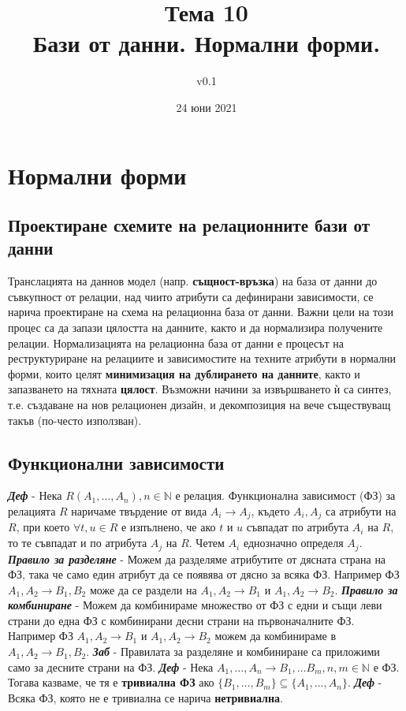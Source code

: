 \documentclass[fleqn,12pt]{article}
\title{Тема 10\\ Бази от данни. Нормални форми.}
\author{v0.1}
\date{24 юни 2021}
\begin{document}
\maketitle
\tableofcontents
\pagebreak


\section{Нормални форми}
\subsection{Проектиране схемите на релационните бази от данни}

Транслацията на даннов модел (напр. \textbf{същност-връзка}) на база от данни до съвкупност от релации, над чиито атрибути са дефинирани зависимости, се нарича проектиране на схема на релационна база от данни.
Важни цели на този процес са да запази цялостта на данните, както и да нормализира получените релации.
\bigbreak
Нормализацията на релационна база от данни е процесът на реструктуриране на релациите и зависимостите на техните атрибути в нормални форми, които целят \textbf{минимизация на дублирането на данните}, както и запазването на тяхната \textbf{цялост}.
Възможни начини за извършването ѝ са синтез, т.е. създаване на нов релационен дизайн, и декомпозиция на вече съществуващ такъв (по-често използван).

\subsection{Функционални зависимости}

\textbf{\textit{Деф}} - Нека $R(A_1, \dots, A_n), n \in \mathbb{N}$ е релация.
Функционална зависимост (ФЗ) за релацията $R$ наричаме твърдение от вида $A_i \rightarrow A_j$, където $A_i, A_j$ са атрибути на $R$, при което $\forall t, u \in R$ е изпълнено, че ако $t$ и $u$ съвпадат по атрибута $A_i$ на $R$, то те съвпадат и по атрибута $A_j$ на $R$.
Четем $A_i$ еднозначно определя $A_j$.
\bigbreak
\textbf{\textit{Правило за разделяне}} - Можем да разделяме атрибутите от дясната страна на ФЗ, така че само един атрибут да се появява от дясно за всяка ФЗ.
Например ФЗ $A_1, A_2 \rightarrow B_1, B_2$ може да се раздели на $A_1, A_2 \rightarrow B_1$ и $A_1, A_2 \rightarrow B_2$.
\bigbreak
\textbf{\textit{Правило за комбиниране}} - Можем да комбинираме множество от ФЗ с едни и същи леви страни до една ФЗ с комбинирани десни страни на първоначалните ФЗ.
Например ФЗ $A_1, A_2 \rightarrow B_1$ и $A_1, A_2 \rightarrow B_2$ можем да комбинираме в $A_1, A_2 \rightarrow B_1, B_2$.
\bigbreak
\textbf{\textit{Заб}} - Правилата за разделяне и комбиниране са приложими само за десните страни на ФЗ.
\bigbreak
\textbf{\textit{Деф}} - Нека $A_1, \dots, A_n \rightarrow B_1, \dots B_m, n, m \in \mathbb{N}$ е ФЗ.
Тогава казваме, че тя е \textbf{тривиална ФЗ} ако $\{B_1, \dots, B_m\} \subseteq \{A_1, \dots, A_n\}$.
\bigbreak
\textbf{\textit{Деф}} - Всяка ФЗ, която не е тривиална се нарича \textbf{нетривиална}.
\end{document}
